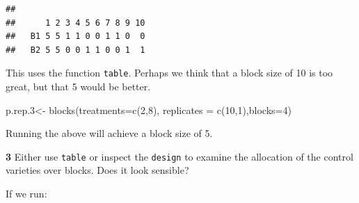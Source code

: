 \documentclass[
]{book}
\makeatletter
\newenvironment{Shaded}{\begin{snugshade}}{\end{snugshade}}
\newcommand{\AttributeTok}[1]{\textcolor[rgb]{0.77,0.63,0.00}{#1}}
\newcommand{\DecValTok}[1]{\textcolor[rgb]{0.00,0.00,0.81}{#1}}
\newcommand{\FloatTok}[1]{\textcolor[rgb]{0.00,0.00,0.81}{#1}}
\newcommand{\FunctionTok}[1]{\textcolor[rgb]{0.00,0.00,0.00}{#1}}
\newcommand{\NormalTok}[1]{#1}
\newcommand{\OtherTok}[1]{\textcolor[rgb]{0.56,0.35,0.01}{#1}}
\newcommand{\SpecialCharTok}[1]{\textcolor[rgb]{0.00,0.00,0.00}{#1}}
\newenvironment{kframe}{%
\medskip{}
\setlength{\fboxsep}{.8em}
 \def\at@end@of@kframe{}%
 \ifinner\ifhmode%
  \def\at@end@of@kframe{\end{minipage}}%
  \begin{minipage}{\columnwidth}%
 \fi\fi%
 \def\FrameCommand##1{\hskip\@totalleftmargin \hskip-\fboxsep
 \colorbox{shadecolor}{##1}\hskip-\fboxsep
     \hskip-\linewidth \hskip-\@totalleftmargin \hskip\columnwidth}%
 \MakeFramed {\advance\hsize-\width
   \@totalleftmargin\z@ \linewidth\hsize
   \@setminipage}}%
 {\par\unskip\endMakeFramed%
 \at@end@of@kframe}
\newenvironment{rmdblock}[1]
  {
  \begin{itemize}
  \renewcommand{\labelitemi}{
    \raisebox{-.7\height}[0pt][0pt]{
      {\setkeys{Gin}{width=3em,keepaspectratio}\texttt{[image: images/\#1]}}
    }
  }
  \setlength{\fboxsep}{1em}
  \begin{kframe}
  \item
  }
  {
  \end{kframe}
  \end{itemize}
  }
\newenvironment{rmdquiz}
  {\begin{rmdblock}{quiz}}
  {\end{rmdblock}}
\makeatother
\begin{document}
\begin{Shaded}
\end{Shaded}

\begin{verbatim}
##     
##      1 2 3 4 5 6 7 8 9 10
##   B1 5 5 1 1 0 0 1 1 0  0
##   B2 5 5 0 0 1 1 0 0 1  1
\end{verbatim}

This uses the function \texttt{table}. Perhaps we think that a block size of 10 is too great, but that 5 would be better.

\begin{Shaded}
\begin{Highlighting}[]
\NormalTok{p.rep}\FloatTok{.3}\OtherTok{\textless{}{-}} \FunctionTok{blocks}\NormalTok{(}\AttributeTok{treatments=}\FunctionTok{c}\NormalTok{(}\DecValTok{2}\NormalTok{,}\DecValTok{8}\NormalTok{), }\AttributeTok{replicates =} \FunctionTok{c}\NormalTok{(}\DecValTok{10}\NormalTok{,}\DecValTok{1}\NormalTok{),}\AttributeTok{blocks=}\DecValTok{4}\NormalTok{)}
\end{Highlighting}
\end{Shaded}

Running the above will achieve a block size of 5.

\begin{rmdquiz}
\textbf{3} Either use \texttt{table} or inspect the \texttt{design} to examine the allocation of the control varieties over blocks. Does it look sensible?
\end{rmdquiz}

If we run:

\begin{Shaded}
\end{Shaded}
\end{document}
